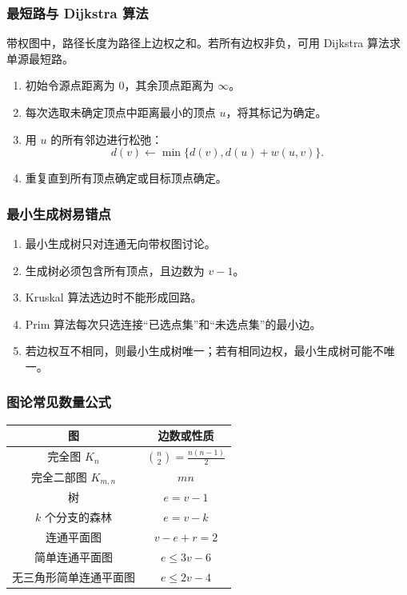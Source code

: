 \subsubsection{最短路与 Dijkstra 算法}

带权图中，路径长度为路径上边权之和。若所有边权非负，可用 Dijkstra 算法求单源最短路。

\begin{enumerate}
	\item 初始令源点距离为 \(0\)，其余顶点距离为 \(\infty\)。
	\item 每次选取未确定顶点中距离最小的顶点 \(u\)，将其标记为确定。
	\item 用 \(u\) 的所有邻边进行松弛：
	\[
	d(v)\leftarrow \min\{d(v),d(u)+w(u,v)\}.
	\]
	\item 重复直到所有顶点确定或目标顶点确定。
\end{enumerate}

\subsubsection{最小生成树易错点}

\begin{enumerate}
	\item 最小生成树只对连通无向带权图讨论。
	\item 生成树必须包含所有顶点，且边数为 \(v-1\)。
	\item Kruskal 算法选边时不能形成回路。
	\item Prim 算法每次只选连接“已选点集”和“未选点集”的最小边。
	\item 若边权互不相同，则最小生成树唯一；若有相同边权，最小生成树可能不唯一。
\end{enumerate}

\subsubsection{图论常见数量公式}

\begin{center}
	\begin{tabular}{cc}
		\toprule
		图 & 边数或性质\\
		\midrule
		完全图 \(K_n\) & \(\binom n2=\frac{n(n-1)}2\)\\
		完全二部图 \(K_{m,n}\) & \(mn\)\\
		树 & \(e=v-1\)\\
		\(k\) 个分支的森林 & \(e=v-k\)\\
		连通平面图 & \(v-e+r=2\)\\
		简单连通平面图 & \(e\le3v-6\)\\
		无三角形简单连通平面图 & \(e\le2v-4\)\\
		\bottomrule
	\end{tabular}
\end{center}

